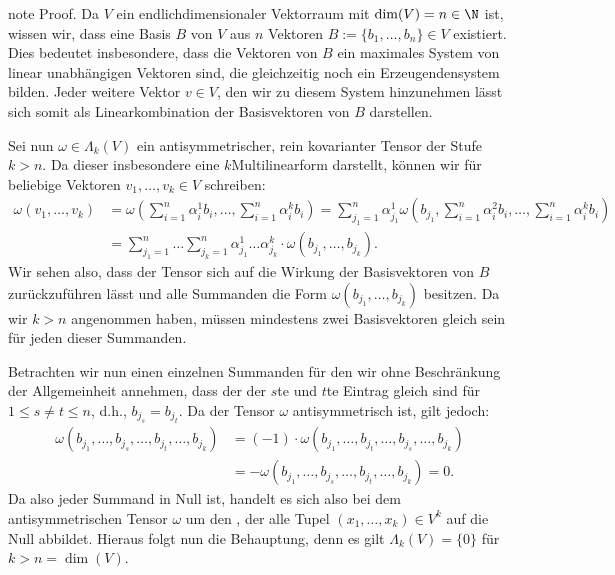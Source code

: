 \documentclass[letterpaper,10pt,german]{jupyterBook}
\begin{document}
\begin{sphinxadmonition}{note}
\sphinxAtStartPar
Proof. Da \(V\) ein endlich\sphinxhyphen{}dimensionaler Vektorraum mit \(\operatorname{dim}(V)=n \in \N\) ist, wissen wir, dass eine Basis \(B\) von \(V\) aus \(n\) Vektoren \(B := \lbrace b_1,\ldots,b_n \rbrace \in V\) existiert.
Dies bedeutet insbesondere, dass die Vektoren von \(B\) ein maximales System von linear unabhängigen Vektoren sind, die gleichzeitig noch ein Erzeugendensystem bilden.
Jeder weitere Vektor \(v \in V\), den wir zu diesem System hinzunehmen lässt sich somit als Linearkombination der Basisvektoren von \(B\) darstellen.

\sphinxAtStartPar
Sei nun \(\omega \in \Lambda_k(V)\) ein antisymmetrischer, rein kovarianter Tensor der Stufe \(k > n\).
Da dieser insbesondere eine \(k\)\sphinxhyphen{}Multilinearform darstellt, können wir für beliebige Vektoren \(v_1, \ldots, v_k \in V\) schreiben:
\begin{equation}\label{equation:vektoranalysis/tensor:eq:antisymmetrischerTensor}
\begin{split}\omega(v_1, \ldots, v_k) &= \omega(\sum_{i=1}^n \alpha_i^1 b_i, \ldots, \sum_{i=1}^n \alpha_i^k b_i) = \sum_{j_1=1}^n \alpha_{j_1}^1 \omega(b_{j_1}, \sum_{i=1}^n \alpha_i^2 b_i, \ldots, \sum_{i=1}^n \alpha_i^k b_i) \\
&= \sum_{j_1=1}^n \ldots \sum_{j_k=1}^n \alpha_{j_1}^1 \ldots \alpha_{j_k}^k \cdot \omega(b_{j_1}, \ldots, b_{j_k}).\end{split}
\end{equation}
\sphinxAtStartPar
Wir sehen also, dass der Tensor sich auf die Wirkung der Basisvektoren von \(B\) zurückzuführen lässt und alle Summanden die Form \(\omega(b_{j_1}, \ldots, b_{j_k})\) besitzen.
Da wir \(k > n\) angenommen haben, müssen mindestens zwei Basisvektoren gleich sein für jeden dieser Summanden.

\sphinxAtStartPar
Betrachten wir nun einen einzelnen Summanden für den wir ohne Beschränkung der Allgemeinheit annehmen, dass der der \(s\)\sphinxhyphen{}te und \(t\)\sphinxhyphen{}te Eintrag gleich sind für \(1 \leq s \neq t \leq n\), d.h., \(b_{j_s}=b_{j_t}\).
Da der Tensor \(\omega\) antisymmetrisch ist, gilt jedoch:
\begin{equation*}
\begin{split}\omega(b_{j_1}, \ldots, b_{j_s}, \ldots, b_{j_t}, \ldots, b_{j_k}) &= (-1) \cdot \omega(b_{j_1}, \ldots, b_{j_t}, \ldots, b_{j_s}, \ldots, b_{j_k}) \\
&= - \omega(b_{j_1}, \ldots, b_{j_s}, \ldots, b_{j_t}, \ldots, b_{j_k}) = 0.\end{split}
\end{equation*}
\sphinxAtStartPar
Da also jeder Summand in {\hyperref[\detokenize{vektoranalysis/tensor:equation-eq-antisymmetrischertensor}]{}} Null ist, handelt es sich also bei dem antisymmetrischen Tensor \(\omega\) um den , der alle Tupel \((x_1, \ldots, x_k) \in V^k\) auf die Null abbildet.
Hieraus folgt nun die Behauptung, denn es gilt \(\Lambda_k(V) = \lbrace 0 \rbrace\) für \(k > n =\operatorname{dim}(V)\).
\end{sphinxadmonition}
\end{document}
